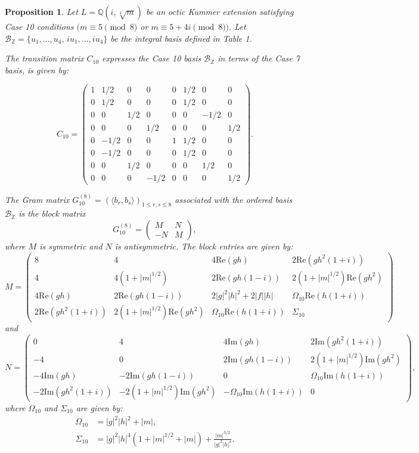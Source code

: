 \documentclass{amsart}
\theoremstyle{plain}
\newtheorem{proposition}[theorem]{Proposition}
\theoremstyle{definition}
\theoremstyle{remark}
\numberwithin{equation}{section}
\begin{document}
\begin{proposition}
Let $L = \mathbb{Q}(i, \sqrt[4]{m})$ be an octic Kummer extension satisfying Case 10 conditions $(m \equiv 5 \pmod 8$ or $m \equiv 5+4i \pmod 8)$. Let $\mathcal{B}_{\mathbb{Z}} = \{u_1, \dots, u_4, \, i u_1, \dots, i u_4\}$ be the integral basis defined in Table 1.

The transition matrix $C_{10}$ expresses the Case 10 basis $\mathcal{B}_{\mathbb{Z}}$ in terms of the Case 7 basis, is given by:

\[
C_{10} = \begin{pmatrix}
1 & 1/2 & 0 & 0 & 0 & 1/2 & 0 & 0 \\
0 & 1/2 & 0 & 0 & 0 & 1/2 & 0 & 0 \\
0 & 0 & 1/2 & 0 & 0 & 0 & -1/2 & 0 \\
0 & 0 & 0 & 1/2 & 0 & 0 & 0 & 1/2 \\
0 & -1/2 & 0 & 0 & 1 & 1/2 & 0 & 0 \\
0 & -1/2 & 0 & 0 & 0 & 1/2 & 0 & 0 \\
0 & 0 & 1/2 & 0 & 0 & 0 & 1/2 & 0 \\
0 & 0 & 0 & -1/2 & 0 & 0 & 0 & 1/2
\end{pmatrix}.
\]

The Gram matrix $G_{10}^{(8)} = (\langle b_r, b_s \rangle)_{1\le r,s \le 8}$ associated with the ordered basis $\mathcal{B}_{\mathbb{Z}}$ is the block matrix
\[
G_{10}^{(8)} = \begin{pmatrix} M & N \\ -N & M \end{pmatrix},
\]
where $M$ is symmetric and $N$ is antisymmetric. The block entries are given by:
\[
M = \begin{pmatrix}
8 & 4 & 4\text{Re}(gh) & 2\text{Re}(gh^2(1+i)) \\
4 & 4(1+|m|^{1/2}) & 2\text{Re}(gh(1-i)) & 2(1+|m|^{1/2})\text{Re}(gh^2) \\
4\text{Re}(gh) & 2\text{Re}(gh(1-i)) & 2|g|^2|h|^2 + 2|f||h| & \Omega_{10} \text{Re}(h(1+i)) \\
2\text{Re}(gh^2(1+i)) & 2(1+|m|^{1/2})\text{Re}(gh^2) & \Omega_{10} \text{Re}(h(1+i)) & \Sigma_{10}
\end{pmatrix}
\]
and
\[
N = \begin{pmatrix}
0 & 4 & 4\text{Im}(gh) & 2\text{Im}(gh^2(1+i)) \\
-4 & 0 & 2\text{Im}(gh(1-i)) & 2(1+|m|^{1/2})\text{Im}(gh^2) \\
-4\text{Im}(gh) & -2\text{Im}(gh(1-i)) & 0 & \Omega_{10} \text{Im}(h(1+i)) \\
-2\text{Im}(gh^2(1+i)) & -2(1+|m|^{1/2})\text{Im}(gh^2) & -\Omega_{10} \text{Im}(h(1+i)) & 0
\end{pmatrix},
\]
where $\Omega_{10}$ and $\Sigma_{10}$ are given by:
\begin{align*}
\Omega_{10} &= |g|^2|h|^2 + |m|, \\
\Sigma_{10} &= |g|^2|h|^4 (1 + |m|^{1/2} + |m|) + \frac{|m|^{3/2}}{|g|^2|h|^4}.
\end{align*}
\end{proposition}
\end{document}
